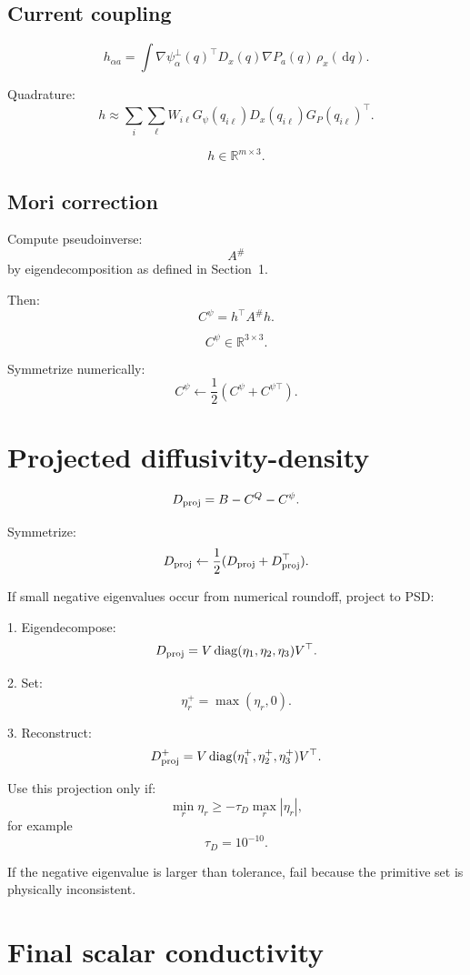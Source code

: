 \documentclass[11pt]{article}
\newcommand{\dd}{\,\mathrm d}
\newcommand{\R}{\mathbb R}
\newcommand{\diag}{\operatorname{diag}}
\begin{document}
\subsection{Current coupling}

\[
h_{\alpha a}
=
\int
\nabla\psi_\alpha^\perp(q)^\top
D_x(q)
\nabla P_a(q)
\,\rho_x(\dd q).
\]

Quadrature:
\[
h
\approx
\sum_i\sum_\ell
W_{i\ell}
G_\psi(q_{i\ell})
D_x(q_{i\ell})
G_P(q_{i\ell})^\top.
\]

\[
h\in\R^{m\times3}.
\]

\subsection{Mori correction}

Compute pseudoinverse:
\[
A^\#
\]
by eigendecomposition as defined in Section~1.

Then:
\[
C^\psi=h^\top A^\# h.
\]

\[
C^\psi\in\R^{3\times3}.
\]

Symmetrize numerically:
\[
C^\psi\leftarrow\frac12(C^\psi+C^{\psi\top}).
\]

\section{Projected diffusivity-density}
\label{sec:Dproj}

\[
D_{\rm proj}
=
B-C^Q-C^\psi.
\]

Symmetrize:
\[
D_{\rm proj}\leftarrow\frac12(D_{\rm proj}+D_{\rm proj}^{\top}).
\]

If small negative eigenvalues occur from numerical roundoff, project to PSD:

1. Eigendecompose:
\[
D_{\rm proj}=V\diag(\eta_1,\eta_2,\eta_3)V^\top.
\]

2. Set:
\[
\eta_r^+=\max(\eta_r,0).
\]

3. Reconstruct:
\[
D_{\rm proj}^{+}=V\diag(\eta_1^+,\eta_2^+,\eta_3^+)V^\top.
\]

Use this projection only if:
\[
\min_r\eta_r\ge -\tau_D\max_r|\eta_r|,
\]
for example
\[
\tau_D=10^{-10}.
\]

If the negative eigenvalue is larger than tolerance, fail because the primitive
set is physically inconsistent.

\section{Final scalar conductivity}
\label{sec:finalsigma}
\end{document}
